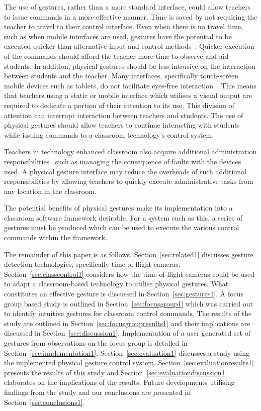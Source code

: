 \documentclass[manuscript, review, screen]{acmart}
\begin{document}
The use of gestures, rather than a more standard interface, could allow teachers to issue commands in a more effective manner.
Time is saved by not requiring the teacher to travel to their control interface.
Even when there is no travel time, such as when mobile interfaces are used, gestures have the potential to be executed quicker than alternative input and control methods~\cite{Dulberg1999,Moyle2001}.
Quicker execution of the commands should afford the teacher more time to observe and aid students.
In addition, physical gestures should be less intrusive on the interaction between students and the teacher. 
Many interfaces, specifically touch-screen mobile devices such as tablets, do not facilitate eyes-free interaction~\cite{Brewster2003}.
This means that teachers using a static or mobile interface which utilises a visual output are required to dedicate a portion of their attention to its use.
This division of attention can interrupt interaction between teachers and students.
The use of physical gestures should allow teachers to continue interacting with students while issuing commands to a classroom technology's control system.

Teachers in technology enhanced classroom also acquire additional administration responsibilities~\cite{Kuhn2005} such as managing the consequence of faults with the devices used.
A physical gesture interface may reduce the overheads of such additional responsibilities by allowing teachers to quickly execute administrative tasks from any location in the classroom.

The potential benefits of physical gestures make its implementation into a classroom software framework desirable.
For a system such as this, a series of gestures must be produced which can be used to execute the various control commands within the framework.

The remainder of this paper is as follows. 
Section~\ref{sec:related1} discusses gesture detection technologies, specifically time-of-flight cameras.
Section~\ref{sec:classcontrol1} considers how the time-of-flight cameras could be used to adapt a classroom-based technology to utilise physical gestures.
What constitutes an effective gesture is discussed in Section~\ref{sec:gestures1}.
A focus group based study is outlined in Section~\ref{sec:focusgroup1} which was carried out to identify intuitive gestures for classroom control commands.
The results of the study are outlined in Section~\ref{sec:focusgroupresults1} and their implications are discussed in Section~\ref{sec:discussion1}. 
Implementation of a user generated set of gestures from observations on the focus group is detailed in Section~\ref{sec:implementation1}.
Section~\ref{sec:evaluation1} discusses a study using the implemented physical gesture control system.
Section~\ref{sec:evaluationresults1} presents the results of this study and Section~\ref{sec:evaluationdiscussion1} elaborates on the implications of the results.
Future developments utilising findings from the study and our conclusions are presented in Section~\ref{sec:conclusions1}.
\end{document}
